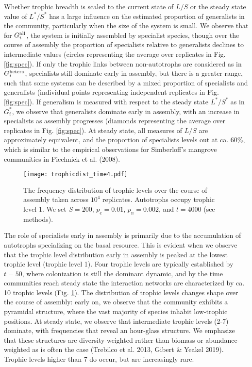 \documentclass[9pt,twocolumn,twoside]{pnas-new}
\newcommand{\rr}[1]{{\rm #1}}
\begin{document}
Whether trophic breadth is scaled to the current state of $L/S$ or the steady state value of $L^*/S^*$ has a large influence on the estimated proportion of generalists in the community, particularly when the size of the system is small.
We observe that for $G_i^{\rr{all}}$, the system is initially assembled by specialist species, though over the course of assembly the proportion of specialists relative to generalists declines to intermediate values (circles representing the average over replicates in Fig. \ref{fig:spec}).
If only the trophic links between non-autotrophs are considered as in $G_i^{\rr{hetero}}$, specialists still dominate early in assembly, but there is a greater range, such that some systems can be described by a mixed proportion of specialists and generalists (individual points representing independent replicates in Fig. \ref{fig:spec}).
If generalism is measured with respect to the steady state $L^*/S^*$ as in $G_i^*$, we observe that generalists dominate early in assembly, with an increase in specialists as assembly progresses (diamonds representing the average over replicates in Fig. \ref{fig:spec}).
At steady state, all measures of $L/S$ are approximately equivalent, and the proportion of specialists levels out at ca. 60\%, which is similar to the empirical observations for Simberloff's mangrove communities in Piechnick et al. (2008).


\begin{figure}
\centering
\texttt{[image: trophicdist\_time4.pdf]}
\caption{
The frequency distribution of trophic levels over the course of assembly taken across $10^4$ replicates. Autotrophs occupy trophic level 1.
We set $S=200$, $p_e=0.01$, $p_n=0.002$, and $t=4000$ (see methods).
}
\label{fig:trophic}
\end{figure}

The role of specialists early in assembly is primarily due to the accumulation of autotrophs specializing on the basal resource.
This is evident when we observe that the trophic level distribution early in assembly is peaked at the lowest trophic level (trophic level 1).
Four trophic levels are typically established by $t=50$, where colonization is still the dominant dynamic, and by the time communities reach steady state the interaction networks are characterized by ca. 10 trophic levels (Fig. \ref{fig:trophic}).
The distribution of trophic levels changes shape over the course of assembly: early on, we observe that the community exhibits a pyramidal structure, where the vast majority of species inhabit low-trophic positions.
At steady state, we observe that intermediate trophic levels (2-7) dominate, with frequencies that reveal an hour-glass structure.
We emphasize that these structures are diversity-weighted rather than biomass or abundance-weighted as is often the case (Trebilco et al. 2013, Gibert \& Yeakel 2019).
Trophic levels higher than 7 do occur, but are increasingly rare.
\end{document}
